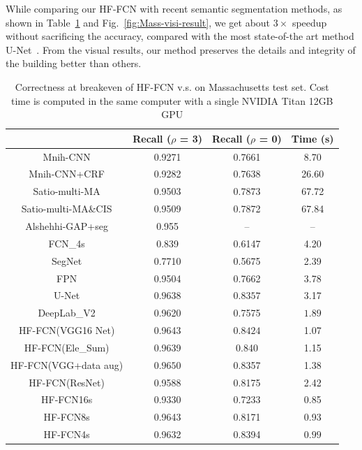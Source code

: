 While comparing our HF-FCN with recent semantic segmentation methods, as shown in Table~\ref{table:Mass-results} and Fig.~\ref{fig:Mass-visi-result}, we get about $3\times$ speedup without sacrificing the accuracy, compared with the most state-of-the art method U-Net~\cite{IEEEexample:ronneberger2015u}.
From the visual results, our method preserves the details and integrity of the building better than others.
\begin{table}
\vspace{-0.2cm}
\setlength{\belowcaptionskip}{-1cm}
\centering
\caption {Correctness at breakeven of HF-FCN v.s. \cite{IEEEexample:mnih2013machine}\cite{IEEEexample:saito2016multiple}\cite{IEEEexample:alshehhi2017simultaneous}\cite{IEEEexample:Long_2015_CVPR}\cite{IEEEexample:badrinarayanan2017segnet}
\cite{IEEEexample:ronneberger2015u}\cite{IEEEexample:chen2016deeplab}\cite{IEEEexample:lin2017feature}on Massachusetts test set. Cost time is computed in the same computer with a single NVIDIA Titan 12GB GPU}
\label{table:Mass-results}
\begin{tabular}{cccc}
\hline
&Recall ($\rho$ = 3)&Recall ($\rho$ = 0)&Time (s)\\
\hline
Mnih-CNN \cite{IEEEexample:mnih2013machine}&0.9271&0.7661&8.70\\
Mnih-CNN+CRF\cite{IEEEexample:mnih2013machine} &0.9282&0.7638&26.60\\
Satio-multi-MA \cite{IEEEexample:saito2016multiple}&0.9503&0.7873&67.72\\
Satio-multi-MA\&CIS \cite{IEEEexample:saito2016multiple}&0.9509&0.7872&67.84\\
Alshehhi-GAP+seg \cite{IEEEexample:alshehhi2017simultaneous}&0.955&{--}&{--} \\ \hline
FCN\_4s\cite{IEEEexample:Long_2015_CVPR}&0.839&0.6147&4.20\\
SegNet\cite{IEEEexample:badrinarayanan2017segnet}&0.7710&0.5675&2.39\\
FPN\cite{IEEEexample:lin2017feature}&0.9504&0.7662&3.78\\
U-Net\cite{IEEEexample:ronneberger2015u}& $\bm{0.9638}$& $\bm{0.8357}$& 3.17\\
DeepLab\_V2\cite{IEEEexample:chen2016deeplab}&0.9620&0.7575&$\bm{1.89}$\\ \hline
HF-FCN(VGG16 Net)&0.9643& $\bm{0.8424}$ &1.07\\
HF-FCN(Ele\_Sum)&0.9639&0.840&1.15\\
HF-FCN(VGG+data aug)&$\bm{0.9650}$&0.8357&1.38\\
HF-FCN(ResNet)&0.9588&0.8175&2.42\\
HF-FCN16s &0.9330&0.7233&0.85\\
HF-FCN8s &0.9643&0.8171&0.93\\
HF-FCN4s &0.9632&0.8394&$\bm{0.99}$\\
\hline
\end{tabular}
\end{table}

